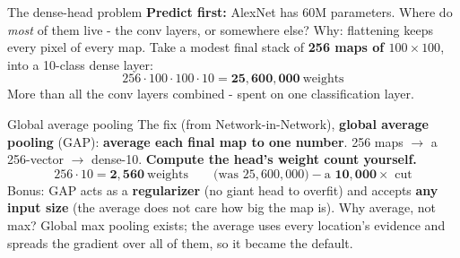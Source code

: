 \documentclass[aspectratio=169]{beamer}
\begin{document}
\begin{frame}{The dense-head problem}
  \textbf{Predict first:} AlexNet has 60M parameters. Where do \emph{most} of them
  live - the conv layers, or somewhere else?
  \pause
  \vskip 6pt
  \vskip 6pt
  Why: flattening keeps every pixel of every map. Take a modest final stack of
  \textbf{256 maps of $100\times100$}, into a 10-class dense layer:
  \[
    256 \cdot 100 \cdot 100 \cdot 10 = \mathbf{25{,}600{,}000}\ \text{weights}
  \]
  \vskip 2pt
  More than all the conv layers combined - spent on one classification layer.
\end{frame}

\begin{frame}{Global average pooling}
  The fix (from Network-in-Network), \textbf{global average pooling} (GAP):
  \textbf{average each final map to one number}. 256 maps $\to$ a 256-vector $\to$ dense-10.
  \vskip 4pt
  \textbf{Compute the head's weight count yourself.}
  \pause
  \[
    256 \cdot 10 = \mathbf{2{,}560}\ \text{weights}
    \qquad\text{(was } 25{,}600{,}000\text{)} - \text{a } \mathbf{10{,}000\times}
    \text{ cut}
  \]
  \vskip 4pt
  Bonus: GAP acts as a \textbf{regularizer} (no giant head to overfit) and accepts
  \textbf{any input size} (the average does not care how big the map is). Why average,
  not max? Global max pooling exists; the average uses every location's evidence and
  spreads the gradient over all of them, so it became the default.
  \vskip 6pt
\end{frame}
\end{document}
